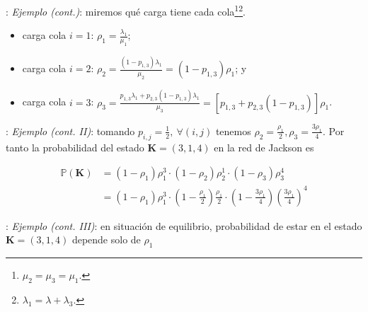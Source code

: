 \documentclass[xcolor={x11names}]{beamer}
\begin{document}
\begin{frame}{\secname: \subsecname}
    \textit{Ejemplo (cont.)}: miremos qué
    carga tiene cada cola\footnote{$\mu_2=\mu_3=\mu_1$.}\footnote{$\lambda_1=\lambda+\lambda_3$.}.

    \begin{itemize}
        \item carga cola $i=1$:
            $\rho_1=\tfrac{\lambda_1}{\mu_1}$;
        \item carga cola $i=2$:
            $\rho_2=\tfrac{(1-p_{1,3})\lambda_1}{\mu_2}=(1-p_{1,3})\rho_1$; y
        \item carga cola $i=3$:
            $\rho_3=\tfrac{p_{1,3}\lambda_1
            +p_{2,3}(1-p_{1,3})\lambda_1}{\mu_3}=[p_{1,3}+p_{2,3}(1-p_{1,3})]\rho_1$.
    \end{itemize}


    \begin{figure}
        \resizebox{.7\textwidth}{!}{%
            
        }
    \end{figure}
\end{frame}



\begin{frame}{\secname: \subsecname}
    \textit{Ejemplo (cont. II)}: tomando
    $p_{i,j}=\tfrac{1}{2},\ \forall (i,j)$ 
    tenemos $\rho_2=\tfrac{\rho_1}{2},
    \rho_3=\tfrac{3\rho_1}{4}$.
    Por tanto la probabilidad del estado
    $\mathbf{K}=(3,1,4)$ en la red de Jackson
    es

    \begin{align*}
        \mathbb{P}(\mathbf{K})&=
        (1-\rho_1)\rho_1^3\cdot
        (1-\rho_2)\rho_2^1 \cdot
        (1-\rho_3)\rho_3^4\\
        &= (1-\rho_1)\rho_1^3\cdot
        \left(1-\frac{\rho_1}{2}\right)\frac{\rho_1}{2}\cdot
        \left(1-\frac{3\rho_1}{4}\right)\left(
        \frac{3\rho_1}{4}\right)^4
    \end{align*}



    \begin{figure}
        \resizebox{.7\textwidth}{!}{%
            
        }
    \end{figure}
\end{frame}




\begin{frame}{\secname: \subsecname}
    \textit{Ejemplo (cont. III)}: en situación
    de equilibrio,
    probabilidad de estar en el estado
    $\mathbf{K}=(3,1,4)$ depende solo de
    $\rho_1$
    \begin{figure}
        
    \end{figure}
\end{frame}
\end{document}
